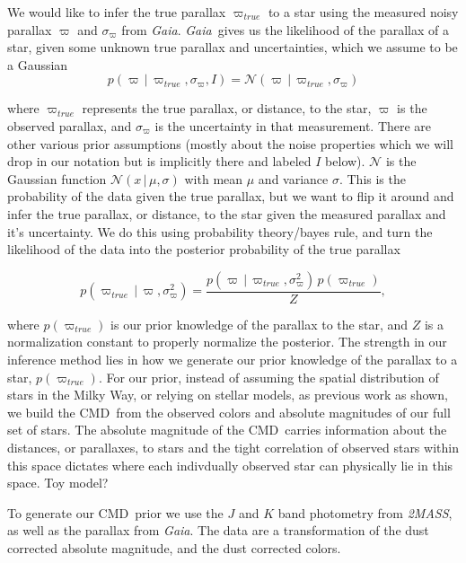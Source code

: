 \documentclass[modern]{aastex61}
\newcommand{\acronym}[1]{{\small{#1}}}
\newcommand{\project}[1]{\textsl{#1}}
\newcommand{\tmass}{\project{\acronym{2MASS}}}
\newcommand{\gaia}{\project{Gaia}}
\newcommand{\cmd}{\acronym{CMD}}
\newcommand{\given}{\,|\,}
\begin{document}
We would like to infer the true parallax $\varpi_{true}$ to a star using the measured noisy parallax $\varpi$ and $\sigma_{\varpi}$ from \gaia. \gaia\ gives us the likelihood of the parallax of a star, given some unknown true parallax and uncertainties, which we assume to be a Gaussian
\begin{equation}
p(\varpi \given \varpi_{true}, \sigma_{\varpi},I) = \mathcal{N}(\varpi \given \varpi_{true}, \sigma_{\varpi})
\label{eq:gaialike}
\end{equation}

where $\varpi_{true}$ represents the true parallax, or distance, to the star, $\varpi$ is the observed parallax, and $\sigma_{\varpi}$ is the uncertainty in that measurement. There are other various prior assumptions (mostly about the noise properties which we will drop in our notation but is implicitly there and labeled $I$ below). $\mathcal{N}$ is the Gaussian function $\mathcal{N}(x \given \mu, \sigma)$ with mean $\mu$ and variance $\sigma$. This is the probability of the data given the true parallax, but we want to flip it around and infer the true parallax, or distance, to the star given the measured parallax and it's uncertainty. We do this using probability theory/bayes rule, and turn the likelihood of the data into the posterior probability of the true parallax

\begin{equation}
p(\varpi_{true} \given \varpi, \sigma^2_{\varpi}) = \frac{p(\varpi \given \varpi_{true}, \sigma^2_{\varpi}) \, p(\varpi_{true})}{Z},
\label{eq:bayes}
\end{equation}

where $p(\varpi_{true})$ is our prior knowledge of the parallax to the star, and $Z$ is a normalization constant to properly normalize the posterior. The strength in our inference method lies in how we generate our prior knowledge of the parallax to a star, $p(\varpi_{true})$. For our prior, instead of assuming the spatial distribution of stars in the Milky Way, or relying on stellar models, as previous work as shown, we build the \cmd\ from the observed colors and absolute magnitudes of our full set of stars. The absolute magnitude of the \cmd\ carries information about the distances, or parallaxes, to stars and the tight correlation of observed stars within this space dictates where each indivdually observed star can physically lie in this space. Toy model?

To generate our \cmd\ prior we use the $J$ and $K$ band photometry from \tmass, as well as the parallax from \gaia. The data are a transformation of the dust corrected absolute magnitude, and the dust corrected colors.
\end{document}
